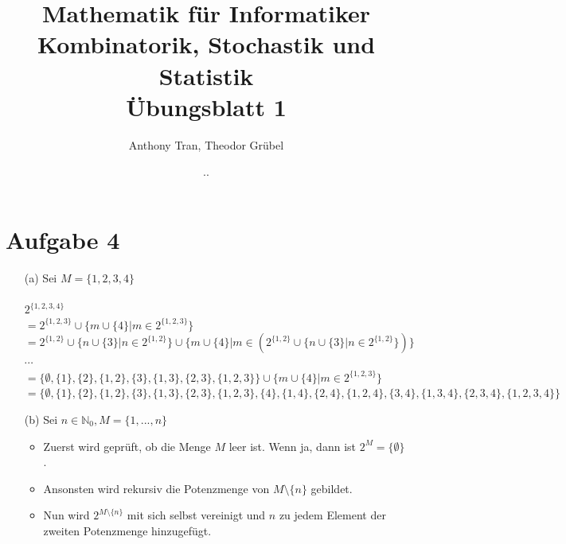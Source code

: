 \documentclass{article}
\title{Mathematik für Informatiker \\
Kombinatorik, Stochastik und Statistik \\
Übungsblatt 1}
\author{Anthony Tran, Theodor Grübel}
\date{\the\day .\the\month .\the\year}
\begin{document}
\maketitle

\section*{Aufgabe 4}

\begin{enumerate}
    \item[(a)] Sei $M = \{1, 2, 3, 4\}$ \\ \\
        $2^{\{1, 2, 3, 4\}}$ \\
        $= 2^{\{1, 2, 3\}} \cup \{m \cup \{4\} \vert m \in 2^{\{1, 2, 3\}}\}$ \\
        $= 2^{\{1, 2\}} \cup \{n \cup \{3\} \vert n \in 2^{\{1, 2\}}\} \cup \{m \cup \{4\} \vert m \in (2^{\{1, 2\}} \cup \{n \cup \{3\} \vert n \in 2^{\{1, 2\}}\})\}$ \\
        $\cdots$ \\
        $= \{\emptyset, \{1\}, \{2\}, \{1, 2\},\{3\}, \{1, 3\}, \{2, 3\}, \{1, 2, 3\}\} \cup \{m \cup \{4\} \vert m \in 2^{\{1, 2, 3\}}\}$ \\
        $= \{\emptyset, \{1\}, \{2\}, \{1, 2\},\{3\}, \{1, 3\}, \{2, 3\}, \{1, 2, 3\}, \{4\}, \{1, 4\}, \{2, 4\}, \{1, 2, 4\}, \{3, 4\}, \{1, 3, 4\}, \{2, 3, 4\}, \{1, 2, 3, 4\}\}$
    
    \item[(b)] Sei $n \in \mathbb{N}_0, M = \{1, ..., n\}$ \\
        \begin{itemize}
            \item Zuerst wird geprüft, ob die Menge $M$ leer ist. Wenn ja, dann ist $2^M = \{\emptyset\}$.
            \item Ansonsten wird rekursiv die Potenzmenge von $M \setminus \{n\}$ gebildet.
            \item Nun wird $2^{M \setminus \{n\}}$ mit sich selbst vereinigt und $n$ zu jedem Element der zweiten Potenzmenge hinzugefügt.
        \end{itemize}
\end{enumerate}
\end{document}
